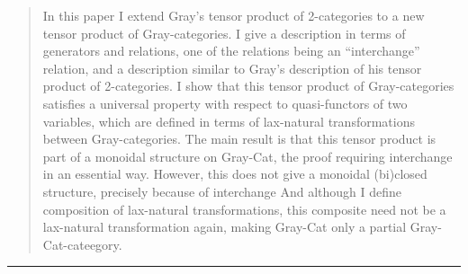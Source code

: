 \begin{quote}
     In this paper I extend Gray's tensor product of 2-categories to a
     new tensor product of Gray-categories. I give a description in
     terms of generators and relations, one of the relations being an
     ``interchange'' relation, and a description similar to Gray's
     description of his tensor product of 2-categories. I show that this
     tensor product of Gray-categories satisfies a universal property
     with respect to quasi-functors of two variables, which are defined
     in terms of lax-natural transformations between
     Gray-categories. The main result is that this tensor product is
     part of a monoidal structure on Gray-Cat, the proof requiring
     interchange in an essential way.  However, this does not give a
     monoidal {(bi)closed} structure, precisely because of interchange
     And although I define composition of lax-natural transformations,
     this composite need not be a lax-natural transformation again,
     making Gray-Cat only a partial Gray-Cat-cateegory.
\end{quote} 



 \par\noindent\rule{\textwidth}{0.4pt}

